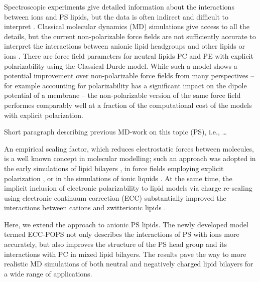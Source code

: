 \documentclass[journal=jpcbfk,manuscript=article]{achemso}
\begin{document}
Spectroscopic experiments give detailed information about the
interactions between ions and PS lipids, but the data is often indirect and difficult to
interpret \cite{hauser77,kurland79,eisenberg79,hauser83,dluhy83,hauser85,feigenson86,mattai89,roux90,roux91,boettcher11}.
Classical molecular dynamics (MD) simulations give
access to all the details, but the current non-polarizable force fields are not
sufficiently accurate to interpret the interactions between anionic
lipid headgroups and other lipids or ions \cite{NMRlipidsIV}.
There are force field parameters for neutral lipids PC and PE 
with explicit polarizability using the Classical Durde model. \cite{chowdhary13, chowdhary17}
While such a model shows a potential improvement over non-polarizable force fields from many perspectives -- 
for example accounting for polarizability has a significant impact on the dipole potential of a membrane \cite{harder2009} -- 
the non-polarizable version of the same force field 
performes comparably well at a fraction of the computational cost 
of the models with explicit polarization. \citep{lucas12,chowdhary13} 

Short paragraph describing previous MD-work on this topic (PS), i.e., \dots 
{}

An empirical scaling factor, which reduces electrostatic forces between molecules, 
is a well known concept in molecular modelling;
such an approach was adopted in the early simulations of lipid bilayers \cite{egberts94, berendsen1996},
in force fields employing explicit polarization \cite{lemkul2016empirical},
or in the simulations of ionic liquids \cite{Bhargava2007}. 
At the same time, 
the implicit inclusion of electronic polarizability to lipid models
via charge re-scaling using electronic continuum correction (ECC) 
substantially improved the interactions between cations and zwitterionic lipids \cite{melcr18}. 


Here, we extend the approach to anionic PS lipids.
The newly developed model termed ECC-POPS 
not only describes the interactions of PS with ions more accurately, 
but also improves the structure of the PS head group 
and its interactions with PC in mixed lipid bilayers. 
The results pave the way to more realistic MD simulations 
of both neutral and negatively charged lipid bilayers 
for a wide range of applications.
\end{document}

